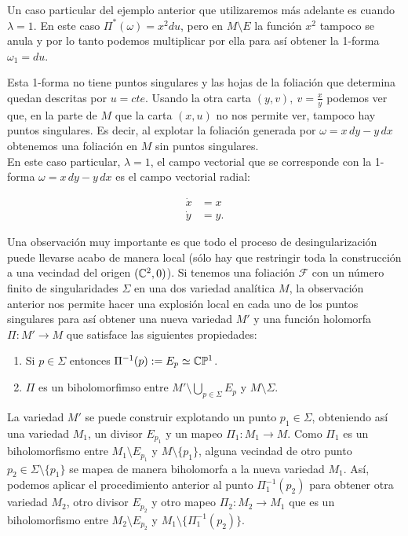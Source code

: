 Un caso particular del ejemplo anterior que utilizaremos más adelante es cuando $\lambda=1$. En este caso $\Pi^{*}(\omega)=x^{2}du$, pero en $M\setminus E$ la función $x^{2}$ tampoco se anula y por lo tanto podemos multiplicar por ella para así obtener la 1-forma $\omega_{1}=du$.

Esta 1-forma no tiene puntos singulares y las hojas de la foliación que determina quedan descritas por $u=cte$. Usando la otra carta $(y,v),\ v=\tfrac{x}{y}$ podemos ver que, en la parte de $M$ que la carta $(x,u)$ no nos permite ver, tampoco hay puntos singulares. Es decir, al explotar la foliación generada por $\omega=x\, dy-y\, dx$ obtenemos una foliación en $M$ sin puntos singulares.\\

En este caso particular, $\lambda=1$, el campo vectorial que se corresponde con la 1-forma $\omega=x\, dy-y\, dx$ es el campo vectorial radial:

\begin{equation}
\begin{aligned}
\dot{x}&=x\\
\dot{y}&=y.
\end{aligned}
\end{equation}

Una observación muy importante es que todo el proceso de desingularización puede llevarse acabo de manera local (sólo hay que restringir toda la construcción a una vecindad del origen $(\mathbb{C}^{2},0)$). Si tenemos una foliación $\mathcal{F}$ con un número finito de singularidades $\Sigma$ en una dos variedad analítica $M$, la observación anterior nos permite hacer una explosión local en cada uno de los puntos singulares para así obtener una nueva variedad $M'$ y una función holomorfa $\Pi\colon M' \rightarrow M$ que satisface las siguientes propiedades:

\begin{enumerate}
\item Si $p\in\Sigma$ entonces $\Pi^{-1}(p):=E_{p}\simeq\mathbb{C}\mathbb{P}^{1}$.
\item $\Pi$ es un biholomorfimso entre $M'\setminus \bigcup_{p\in\Sigma} E_{p}$ y $M\setminus\Sigma$.
\end{enumerate}

La variedad $M'$ se puede construir explotando un punto $p_{1}\in\Sigma$, obteniendo así una variedad $M_{1}$, un divisor $E_{p_{1}}$ y un mapeo $\Pi_{1}\colon M_{1}\rightarrow M$. Como $\Pi_{1}$ es un biholomorfismo entre $M_{1}\setminus E_{p_{1}}$ y $M\setminus \{p_{1}\}$, alguna vecindad de otro punto $p_{2}\in\Sigma\setminus \{p_{1}\}$ se mapea de manera biholomorfa a la nueva variedad $M_{1}$. Así, podemos aplicar el procedimiento anterior al punto $\Pi^{-1}_{1}(p_{2})$ para obtener otra variedad $M_{2}$, otro divisor $E_{p_{2}}$ y otro mapeo $\Pi_{2}\colon M_{2}\rightarrow M_{1}$ que es un biholomorfismo entre $M_{2}\setminus E_{p_{2}}$ y $M_{1}\setminus \{\Pi^{-1}_{1}(p_{2})\}$.\\ 

